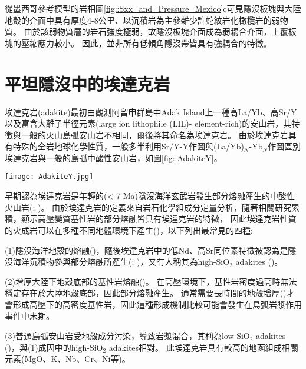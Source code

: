 從墨西哥參考模型的岩相圖\ref{fig::Sxx_and_Pressure_Mexico}c可見隱沒板塊與大陸地殼的介面中具有厚度4-8公里、以沉積岩為主參雜少許蛇紋岩化橄欖岩的弱物質。
由於該弱物質層的岩石強度極弱，故隱沒板塊介面成為弱耦合介面，上覆板塊的壓縮應力較小。
因此，並非所有低傾角隱沒帶皆具有強耦合的特徵。

\section{平坦隱沒中的埃達克岩}\label{平坦隱沒中的埃達克岩}
埃達克岩(adakite)最初由\citet{kay1978aleutian}觀測阿留申群島中Adak Island上一種高La/Yb、高Sr/Y以及富含大離子半徑元素(large ion lithophile (LIL)- element-rich)的安山岩，其特徵與一般的火山島弧安山岩不相同，爾後\citet{defant1990derivation}將其命名為埃達克岩。
由於埃達克岩具有特殊的全岩地球化學性質，一般多半利用Sr/Y-Y作圖與(La/Yb)$_N$-Yb$_N$作圖區別埃達克岩與一般的島弧中酸性安山岩，如圖\ref{fig::AdakiteY}。

\begin{figure*}[h]
    \centering
    \texttt{[image: AdakiteY.jpg]}
    \caption[Sr/Y-Y作圖與(La/Yb)$_N$-Yb$_N$作圖]{(A)Sr/Y-Y作圖與(B)(La/Yb)$_N$-Yb$_N$作圖，摘自\citet{castillo2012adakite}。通常用於區分埃達克岩與普通島弧安山岩、石英岩與流紋岩(normal arc andesite, dacite and rhyolite, ADR)。紫色實線邊界來自於\citet{richards2007special}所提出菲律賓中南部埃達克岩與普通島弧安山岩的資料。}
    \label{fig::AdakiteY}
\end{figure*}

早期認為埃達克岩是年輕的(< 7 Ma)隱沒海洋玄武岩發生部分熔融產生的中酸性火山岩(\citealp{defant1990derivation}; \citealp{peacock1994partial})。
由於埃達克岩的定義來自岩石化學組成分定量分析，隨著相關研究累積，顯示高壓變質基性岩的部分熔融皆具有埃達克岩的特徵，
因此埃達克岩性質的火成岩可以在多種不同地體環境下產生(\citealp{martin2005overview})，以下列出最常見的四種:

(1)隱沒海洋地殼的熔融(\citealp{defant1990derivation})，隨後埃達克岩中的低Nd、高Sr同位素特徵被認為是隱沒海洋沉積物參與部分熔融所產生(\citealp{stern1996role}; \citealp{gomez2003temporal})，又有人稱其為high-SiO$_2$ adakites (\citealp{martin2005overview})。

(2)增厚大陸下地殼底部的基性岩熔融(\citealp{kay1996magmatic})。
在高壓環境下，基性岩密度過高時無法穩定存在於大陸地殼底部，因此部分熔融產生。
通常需要長時間的地殼增厚(\citealp{kay2002magmatism})才會形成高壓下的高密度基性岩，因此這種形成機制比較可能會發生在島弧岩漿作用事件中末期。

(3)普通島弧安山岩受地殼成分污染，導致岩漿混合，其稱為low-SiO$_2$ adakites (\citealp{martin2005overview})，與(1)成因中的high-SiO$_2$ adakites相對。
此埃達克岩具有較高的地函組成相關元素(MgO、K、Nb、Cr、Ni等)。

